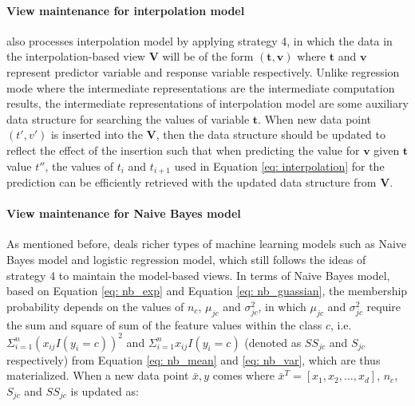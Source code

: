 \paragraph{View maintenance for interpolation model} \cite{deshpande2006mauvedb} also processes interpolation model by applying strategy 4, in which the data in the interpolation-based view $\textbf{V}$ will be of the form $(\textbf{t}, \textbf{v})$ where $\textbf{t}$ and $\textbf{v}$ represent predictor variable and response variable respectively. Unlike regression mode where the intermediate representations are the intermediate computation results, the intermediate representations of interpolation model are some auxiliary data structure for searching the values of variable $\textbf{t}$. When new data point $(t', v')$ is inserted into the $\textbf{V}$, then the data structure should be updated to reflect the effect of the insertion such that when predicting the value for $\textbf{v}$ given $\textbf{t}$ value $t''$, the values of $t_{i}$ and $t_{i+1}$ used in Equation \ref{eq: interpolation} for the prediction can be efficiently retrieved with the updated data structure from $\textbf{V}$.


\paragraph{View maintenance for Naive Bayes model}
As mentioned before, \cite{gupta2015processing} deals richer types of machine learning models such as Naive Bayes model and logistic regression model, which still follows the ideas of strategy 4 to maintain the model-based views. In terms of Naive Bayes model, based on Equation \ref{eq: nb_exp} and Equation \ref{eq: nb_guassian}, the membership probability depends on the values of $n_c$, $\mu_{jc}$ and $\sigma_{jc}^2$, in which $\mu_{jc}$ and $\sigma_{jc}^2$ require the sum and square of sum of the feature values within the class $c$, i.e. $\Sigma_{i=1}^n(x_{ij}I(y_i=c))^2$ and $\Sigma_{i=1}^nx_{ij}I(y_i=c)$ (denoted as $SS_{jc}$ and $S_{jc}$ respectively) from Equation \ref{eq: nb_mean} and \ref{eq: nb_var}, which are thus materialized. When a new data point $\bar{x}, y$ comes where $\bar{x}^T = [x_1, x_2, \dots, x_d]$, $n_c$, $S_{jc}$ and $SS_{jc}$ is updated as:

